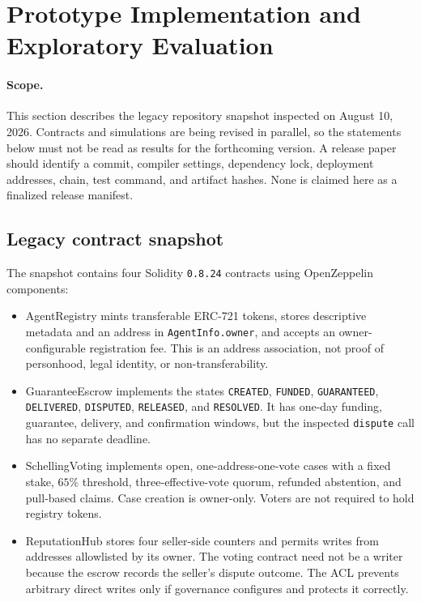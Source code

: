 \section{Prototype Implementation and Exploratory Evaluation}
\label{sec:impl}

\paragraph{Scope.}
This section describes the legacy repository snapshot inspected on August 10, 2026. Contracts and
simulations are being revised in parallel, so the statements below must not be read as results for the
forthcoming version. A release paper should identify a commit, compiler settings, dependency lock,
deployment addresses, chain, test command, and artifact hashes. None is claimed here as a finalized
release manifest.

\subsection{Legacy contract snapshot}
\label{sec:contracts}

The snapshot contains four Solidity \texttt{0.8.24} contracts using OpenZeppelin components:
\begin{itemize}[leftmargin=2em,itemsep=2pt]
  \item \textsf{AgentRegistry} mints transferable ERC-721 tokens, stores descriptive metadata and an
  address in \texttt{AgentInfo.owner}, and accepts an owner-configurable registration fee. This is an
  address association, not proof of personhood, legal identity, or non-transferability.
  \item \textsf{GuaranteeEscrow} implements the states \texttt{CREATED}, \texttt{FUNDED},
  \texttt{GUARANTEED}, \texttt{DELIVERED}, \texttt{DISPUTED}, \texttt{RELEASED}, and
  \texttt{RESOLVED}. It has one-day funding, guarantee, delivery, and confirmation windows, but the
  inspected \texttt{dispute} call has no separate deadline.
  \item \textsf{SchellingVoting} implements open, one-address-one-vote cases with a fixed stake,
  $65\%$ threshold, three-effective-vote quorum, refunded abstention, and pull-based claims. Case
  creation is owner-only. Voters are not required to hold registry tokens.
  \item \textsf{ReputationHub} stores four seller-side counters and permits writes from addresses
  allowlisted by its owner. The voting contract need not be a writer because the escrow records the
  seller's dispute outcome. The ACL prevents arbitrary direct writes only if governance configures and
  protects it correctly.
\end{itemize}

